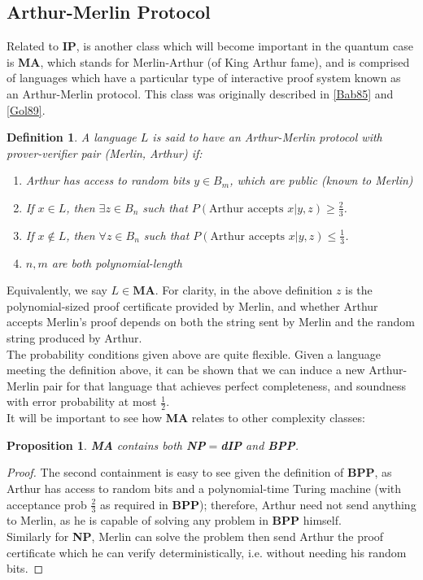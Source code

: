 \documentclass[12pt]{article}
\newtheorem*{defn}{Definition}
\newtheorem*{prop}{Proposition}
\begin{document}
	\subsection{Arthur-Merlin Protocol}
	Related to \textbf{IP}, is another class which will become important in the quantum case is \textbf{MA}, which stands for Merlin-Arthur (of King Arthur fame), and is comprised of languages which have a particular type of interactive proof system known as an Arthur-Merlin protocol. This class was originally described in \hyperref[bab]{[Bab85]} and \hyperref[gol89]{[Gol89]}.
	
	\begin{defn}
		A language $L$ is said to have an Arthur-Merlin protocol with prover-verifier pair (Merlin, Arthur) if:
		\begin{enumerate}
			\item Arthur has access to random bits $y\in B_m$, which are public (known to Merlin)
			\item If $x\in L$, then $\exists z\in B_n$ such that $P(\text{Arthur accepts }x|y,z)\geq \frac{2}{3}$.
			\item If $x\notin L$, then $\forall z\in B_n$ such that $P(\text{Arthur accepts }x|y,z)\leq\frac{1}{3}$. 
			\item $n,m$ are both polynomial-length
		\end{enumerate}
	
	
	\end{defn}
	Equivalently, we say $L\in \textbf{MA}$. For clarity, in the above definition $z$ is the polynomial-sized proof certificate provided by Merlin, and whether Arthur accepts Merlin's proof depends on both the string sent by Merlin and the random string produced by Arthur.\\
	
	The probability conditions given above are quite flexible. Given a language meeting the definition above, it can be shown that we can induce a new Arthur-Merlin pair for that language that achieves perfect completeness, and soundness with error probability at most $\frac{1}{2}$.\\
	
	It will be important to see how \textbf{MA} relates to other complexity classes:
	\begin{prop}\textbf{MA} contains both \textbf{NP}$=$\textbf{dIP} and \textbf{BPP}. \end{prop}
	\begin{proof}The second containment is easy to see given the definition of \textbf{BPP}, as Arthur has access to random bits and a polynomial-time Turing machine (with acceptance prob $\frac{2}{3}$ as required in \textbf{BPP}); therefore, Arthur need not send anything to Merlin, as he is capable of solving any problem in \textbf{BPP} himself.\\Similarly for \textbf{NP}, Merlin can solve the problem then send Arthur the proof certificate which he can verify deterministically, i.e. without needing his random bits. \end{proof}
	
\end{document}
